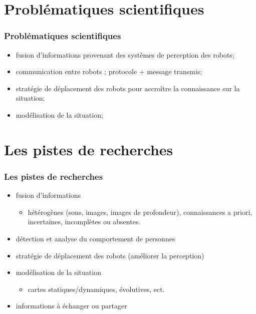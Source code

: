 \documentclass[usepdftitle=false, xcolor=dvipsnames, 12, c]{beamer}
\begin{document}
% 
 \section{Problématiques scientifiques}
\begin{frame}
  \frametitle{Problématiques scientifiques}
  \begin{itemize}
    \item fusion d'informations provenant des systèmes de perception des robots;
    \item communication entre robots ; protocole + message transmis;
    \item stratégie de déplacement des robots pour accroître la connaissance sur la situation;
    \item modélisation de la situation;
   \end{itemize}
\end{frame}

 \section{Les pistes de recherches}
\begin{frame}
  \frametitle{Les pistes de recherches}
  \begin{itemize}
   \item fusion d'informations 
   \begin{itemize}
     \item[] hétérogènes (sons, images, images de profondeur), connaissances a priori, incertaines, incomplètes ou absentes.
   \end{itemize}
   \item détection et analyse du comportement de personnes 
   \item stratégie de déplacement des robots (améliorer la perception)
   \item modélisation de la situation
   \begin{itemize}
     \item[] cartes statiques/dynamiques, évolutives, ect.
   \end{itemize}
   \item informations à échanger ou partager
  \end{itemize}
\end{frame}
\end{document}
